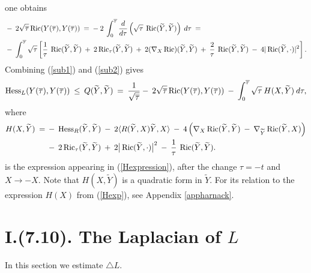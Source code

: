 one obtains
\begin{align} \label{sub2}
& - \: 2 \sqrt{\overline{\tau}} \operatorname{Ric}({Y}({\overline{\tau}}),
{Y}({\overline{\tau}})) \: = \: - \: 2 \:
\int_0^{\overline{\tau}} \frac{d}{d\tau} \left(
\sqrt{\tau} \: \operatorname{Ric}(\widetilde{Y}, \widetilde{Y}) \right) \: d\tau \: =  \\
& - \: \int_0^{\overline{\tau}} \sqrt{\tau}
\left[ \frac{1}{\tau} \: \operatorname{Ric}(\widetilde{Y}, \widetilde{Y})
\: + \: 2 \operatorname{Ric}_\tau (\widetilde{Y}, \widetilde{Y})
\: + \: 2 (\nabla_X \operatorname{Ric})(\widetilde{Y}, \widetilde{Y}) \: + \:
\frac{2}{\tau} \: \operatorname{Ric}(\widetilde{Y}, \widetilde{Y})
\: - \: 4 |\operatorname{Ric}(\widetilde{Y}, \cdot)|^2 \right]. \notag
\end{align}
Combining (\ref{sub1}) and (\ref{sub2}) gives
\begin{equation} \label{sub3}
\operatorname{Hess}_L(Y({\overline{\tau}}), Y({\overline{\tau}})) \: \le \:
Q(\widetilde{Y}, \widetilde{Y}) \: = \:
\frac{1}{\sqrt{\overline{\tau}}}
 - \: 2 \sqrt{\overline{\tau}} \operatorname{Ric}({Y}({\overline{\tau}}),
{Y}({\overline{\tau}})) \: - \: \int_0^{\overline{\tau}}
\sqrt{\tau} \: H(X, \widetilde{Y}) \: d\tau,
\end{equation}
where
\begin{align} \label{Htilde}
H(X, \widetilde{Y}) \: = \: & - \: \operatorname{Hess}_R
(\widetilde{Y},\widetilde{Y}) \: - \: 2 \langle
R(\widetilde{Y}, X)\widetilde{Y}, X \rangle
\: -\: 4 \left( \nabla_X \operatorname{Ric}(\widetilde{Y}, \widetilde{Y})
\: - \: \nabla_{\widetilde{Y}} \operatorname{Ric}(\widetilde{Y}, X) \right) \\
&  - \: 2 \operatorname{Ric}_\tau(\widetilde{Y}, \widetilde{Y}) \: + \:
2 \big| \operatorname{Ric}(\widetilde{Y}, \cdot) \big|^2
\: - \: \frac{1}{\tau} \: \operatorname{Ric}(\widetilde{Y}, \widetilde{Y}). \notag
\end{align}
is the expression appearing in
(\ref{Hexpression}), after the change $\tau = - t$ and $X \rightarrow -X$.
Note that $H(X, \widetilde{Y})$ is a quadratic form in
$\widetilde{Y}$. For its relation to the expression
$H(X)$ from (\ref{Hexp}), see Appendix \ref{appharnack}.


\section{I.(7.10). The Laplacian of $L$} \label{7.10}

In this section we estimate $\triangle L$.

